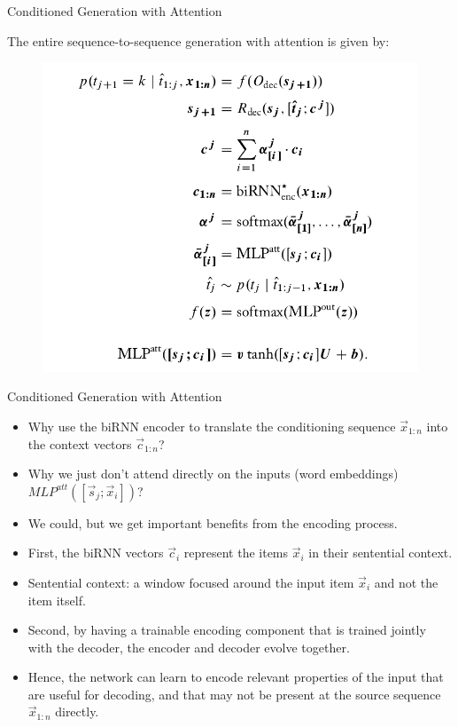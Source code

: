 \documentclass[handout]{beamer}
\begin{document}
\begin{frame}{Conditioned Generation with Attention}
\begin{scriptsize}
The entire sequence-to-sequence generation with attention is given by:

\begin{figure}[h]
        	\includegraphics[scale = 0.3]{pics/attentionformula.png}
        \end{figure}  

        
                
\end{scriptsize}
\end{frame}



\begin{frame}{Conditioned Generation with Attention}
\begin{scriptsize}
\begin{itemize}
\item Why use the biRNN encoder to translate the conditioning sequence $\vec{x}_{1:n}$  into the context vectors $\vec{c}_{1:n}$?
\item Why we just don't attend directly on the inputs (word embeddings) $MLP^{att}([\vec{s}_j;\vec{x}_i])$?
\item We could, but we get important benefits from the encoding process.
\item First, the biRNN vectors $\vec{c}_i$ represent the items $\vec{x}_i$ in their sentential context.
\item Sentential context: a window focused around the input item $\vec{x}_i$ and not the item itself.
\item Second, by having a trainable encoding component that is trained jointly with the decoder, the encoder and decoder evolve together.
\item Hence, the network can learn to encode relevant properties of the input that are useful for decoding, and that may not be present at the source sequence $\vec{x}_{1:n}$ directly.
\end{itemize}
\end{scriptsize}
\end{frame}
\end{document}
